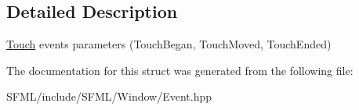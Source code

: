 \subsection{Detailed Description}
\mbox{\hyperlink{classsf_1_1_touch}{Touch}} events parameters (Touch\+Began, Touch\+Moved, Touch\+Ended) 

\begin{DoxyVerb}\end{DoxyVerb}
 

The documentation for this struct was generated from the following file\+:\begin{DoxyCompactItemize}
\item 
S\+F\+M\+L/include/\+S\+F\+M\+L/\+Window/Event.\+hpp\end{DoxyCompactItemize}

